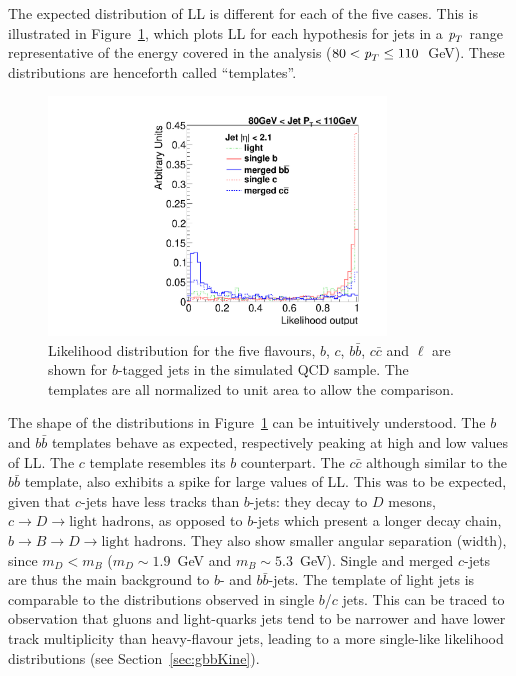 The expected distribution of LL is different for each of the five cases. This is illustrated in Figure~\ref{fig:templates}, which plots LL for each hypothesis for jets in a ${\emph{p}_{T}}$ range representative of the energy covered in the analysis ($80<{\emph{p}_{T}}\leq110$~GeV). These distributions are henceforth called ``templates''. 
\begin{figure}[htb]
\centering
\includegraphics[width=0.80\textwidth]{FIGS/Fits/AllTemplates080.pdf}
\caption{Likelihood distribution for the five flavours, $b$, $c$, $b\bar{b}$, $c\bar{c}$ and $\ell$ are shown for $b$-tagged jets in the simulated QCD sample. The templates are all normalized to unit area to allow the comparison.}
\label{fig:templates}
\end{figure}
The shape of the distributions in Figure~\ref{fig:templates} can be intuitively understood. The $b$ and $b\bar{b}$ templates behave as expected, respectively peaking at high and low values of LL. The $c$ template resembles its $b$ counterpart. The $c\bar{c}$ although similar to the $b\bar{b}$ template, also exhibits a spike for large values of LL.  
This was to be expected, given that $c$-jets have less tracks than $b$-jets: they decay to $D$ mesons, $c \rightarrow D \rightarrow \mbox{light hadrons}$, as opposed to $b$-jets which present a longer decay chain, $b \rightarrow B \rightarrow D\rightarrow \mbox{light hadrons}$. They also show smaller angular separation (width), since $m_D < m_B$  ($m_D\sim 1.9$~GeV and $m_B \sim 5.3$~GeV).
Single and merged $c$-jets are thus the main background to $b$- and $b\bar{b}$-jets. The template of light jets  %
is comparable to the distributions observed in single $b$/$c$ jets. This can be traced to observation that gluons and light-quarks jets tend to be narrower and have lower track multiplicity than heavy-flavour jets, leading to a more single-like likelihood distributions (see Section~\ref{sec:gbbKine}).


